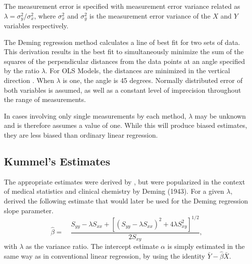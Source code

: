 \documentclass[12pt, a4paper]{report}
\theoremstyle{plain}
\theoremstyle{definition}
\theoremstyle{remark}
\begin{document}
The measurement error is specified with measurement error variance related as 
$\displaystyle{\lambda =\sigma^2_y/\sigma^2_x}$, where $\sigma^2_x$ and $\sigma^2_y$ is the measurement error variance of the $X$ and $Y$ variables respectively.

The Deming regression method calculates a line of best fit for two sets of data. This derivation results in the best fit to simultaneously minimize the sum of the squares of the perpendicular distances from the data points at an angle specified by the ratio $\lambda$. For OLS Models, the distances are minimized in the vertical direction \citep{linnet99}. When $\lambda$ is one, the angle is 45 degrees. Normally distributed error of both variables is assumed, as well as a constant level of imprecision throughout the range of measurements.

In cases involving only single measurements by each method, $\lambda$ may be unknown and is therefore assumes a value of one. While this will produce biased estimates, they are less biased than ordinary linear regression.


\subsection{Kummel's Estimates}

The appropriate estimates were derived by \citet{Kummel}, but were popularized in the context of medical statistics and clinical chemistry by Deming (1943).
For a given $\lambda$, \citet{Kummel} derived the following estimate that would later be used for the Deming regression slope
parameter. 
\begin{equation}
\hat{\beta} =\quad \frac{S_{yy} - \lambda S_{xx}+[(S_{yy} -
	\lambda S_{xx})^{2}+ 4\lambda S^{2}_{xy}]^{1/2}}{2S_{xy}},
\end{equation}
with $\lambda$ as the variance ratio. The intercept estimate $\alpha$ is simply estimated in the same way as in conventional linear
regression, by using the identity $\bar{Y}-\hat{\beta}\bar{X}$.  

\end{document}
